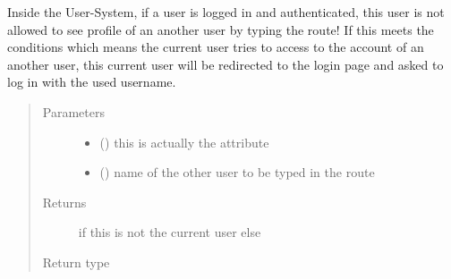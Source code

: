 \documentclass[a4paper,12pt,english]{sphinxmanual}
\begin{document}

\begin{fulllineitems}
\label{\detokenize{project_rst/user_rst/helpers:project.user.helpers.is_not_current_user}}
Inside the User-System, if a user is logged in and authenticated,
this user is not allowed to see profile of an another user by typing the route!
If this meets the conditions which means the current user tries to access to
the account of an another user, this current user will be redirected to the login page
and asked to log in with the used username.
\begin{quote}\begin{description}
\item[{Parameters}] \leavevmode\begin{itemize}
\item {} 
 () \textendash{} this is actually
the attribute 

\item {} 
 () \textendash{} name of the other user to be typed in the route

\end{itemize}

\item[{Returns}] \leavevmode
{} if this is not the current user else 

\item[{Return type}] \leavevmode
{}

\end{description}\end{quote}

\end{fulllineitems}

\end{document}
